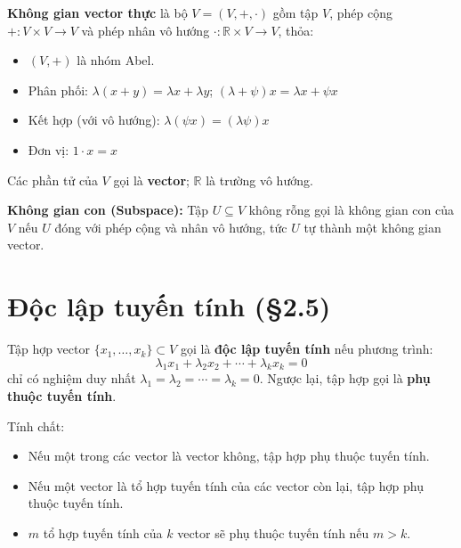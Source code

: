 \documentclass[12pt,a4paper]{article}
\begin{document}
\begin{dinhnghia}
\textbf{Không gian vector thực} là bộ $V = (V, +, \cdot)$ gồm tập $V$, phép cộng $+ : V \times V \to V$ và phép nhân vô hướng $\cdot : \mathbb{R} \times V \to V$, thỏa:
\begin{itemize}
  \item $(V, +)$ là nhóm Abel.
  \item Phân phối: $\lambda(x + y) = \lambda x + \lambda y$; $(\lambda + \psi)x = \lambda x + \psi x$
  \item Kết hợp (với vô hướng): $\lambda(\psi x) = (\lambda \psi)x$
  \item Đơn vị: $1 \cdot x = x$
\end{itemize}
Các phần tử của $V$ gọi là \textbf{vector}; $\mathbb{R}$ là trường vô hướng.
\end{dinhnghia}

\begin{dinhnghia}
\textbf{Không gian con (Subspace):} Tập $U \subseteq V$ không rỗng gọi là không gian con của $V$ nếu $U$ đóng với phép cộng và nhân vô hướng, tức $U$ tự thành một không gian vector.
\end{dinhnghia}

\section{Độc lập tuyến tính (§2.5)}

\begin{dinhnghia}
Tập hợp vector $\{x_1, \ldots, x_k\} \subset V$ gọi là \textbf{độc lập tuyến tính} nếu phương trình:
\[
  \lambda_1 x_1 + \lambda_2 x_2 + \cdots + \lambda_k x_k = 0
\]
chỉ có nghiệm duy nhất $\lambda_1 = \lambda_2 = \cdots = \lambda_k = 0$.
Ngược lại, tập hợp gọi là \textbf{phụ thuộc tuyến tính}.
\end{dinhnghia}

\begin{dinhly}
Tính chất:
\begin{itemize}
  \item Nếu một trong các vector là vector không, tập hợp phụ thuộc tuyến tính.
  \item Nếu một vector là tổ hợp tuyến tính của các vector còn lại, tập hợp phụ thuộc tuyến tính.
  \item $m$ tổ hợp tuyến tính của $k$ vector sẽ phụ thuộc tuyến tính nếu $m > k$.
\end{itemize}
\end{dinhly}
\end{document}
